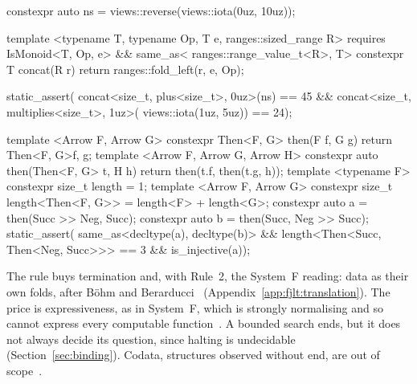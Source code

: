 \begin{listing}[htbp]
\begin{minipage}[t]{0.48\linewidth}
\begin{cpp}
constexpr auto ns =
    views::reverse(views::iota(0uz, 10uz));

template <typename T, typename Op, T e,
          ranges::sized_range R>
  requires IsMonoid<T, Op, e> && same_as<
      ranges::range_value_t<R>, T>
constexpr T concat(R r) {
  return ranges::fold_left(r, e, Op{}); }

static_assert(
concat<size_t, plus<size_t>, 0uz>(ns)
    == 45 &&
concat<size_t, multiplies<size_t>, 1uz>(
    views::iota(1uz, 5uz)) == 24);
\end{cpp}
\end{minipage}\hfill
\begin{minipage}[t]{0.48\linewidth}
\begin{cpp}
template <Arrow F, Arrow G>
constexpr Then<F, G> then(F f, G g)
  { return Then<F, G>{f, g}; }
template <Arrow F, Arrow G, Arrow H>
constexpr auto then(Then<F, G> t, H h)
  { return then(t.f, then(t.g, h)); }
template <typename F>
constexpr size_t length = 1;
template <Arrow F, Arrow G>
constexpr size_t length<Then<F, G>> =
    length<F> + length<G>;
constexpr auto a =
    then(Succ{} >> Neg{}, Succ{});
constexpr auto b =
    then(Succ{}, Neg{} >> Succ{});
static_assert(
same_as<decltype(a), decltype(b)> &&
length<Then<Succ, Then<Neg, Succ>>>
    == 3 && is_injective(a));
\end{cpp}
\end{minipage}
\caption{\hyperref[def:rule3]{Rule~3}: Descent, Equations~\eqref{eq:fold} and~\eqref{eq:cata} in code, on the names of Listings~\ref{lst:rule1} and~\ref{lst:rule2}.
Left: over a value,  at any length, on a range that counts down.
Right: over a type, a composition that brackets to the right, and the length of a term.}
\label{lst:rule3}
\end{listing}

The rule buys termination and, with Rule~2, the System~F reading: data as their own folds, after B\"ohm and Berarducci~\cite{bohm1985automatic} (Appendix~\ref{app:fjlt:translation}).
The price is expressiveness, as in System~F, which is strongly normalising and so cannot express every computable function~\cite{girard1989proofs}.
A bounded search ends, but it does not always decide its question, since halting is undecidable~\cite{turing1936computable} (Section~\ref{sec:binding}).
Codata, structures observed without end, are out of scope~\cite{turner2004total}.

